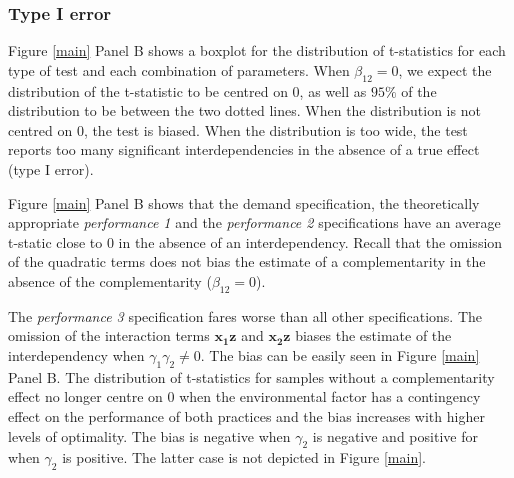\documentclass[12pt]{article}
\begin{document}
\subsubsection{Type I error}\label{Type I error}
Figure \ref{main} Panel B shows a boxplot for the distribution of t-statistics for each type of test and each combination of parameters. When $\beta_{12} = 0$, we expect the distribution of the t-statistic to be centred on $0$, as well as $95\%$ of the distribution to be between the two dotted lines. When the distribution is not centred on $0$, the test is biased. When the distribution is too wide, the test reports too many significant interdependencies in the absence of a true effect (type I error).

Figure \ref{main} Panel B shows that the demand specification, the theoretically appropriate \emph{performance 1} and the \emph{performance 2} specifications have an average t-static close to 0 in the absence of an interdependency. Recall that the omission of the quadratic terms does not bias the estimate of a complementarity in the absence of the complementarity ($\beta_{12} = 0$).

The \emph{performance 3}  specification fares worse than all other specifications. The omission of the interaction terms \(\mathbf{x_1z}\) and \(\mathbf{x_2z}\) biases the estimate of the interdependency when $\gamma_1 \gamma_2 \neq 0$. The bias can be easily seen in Figure \ref{main} Panel B. The distribution of t-statistics for samples without a complementarity effect no longer centre on $0$ when the environmental factor has a contingency effect on the performance of both practices and the bias increases with higher levels of optimality. The bias is negative when $\gamma_2$ is negative and positive for when $\gamma_2$ is positive. The latter case is not depicted in Figure \ref{main}.
\end{document}
